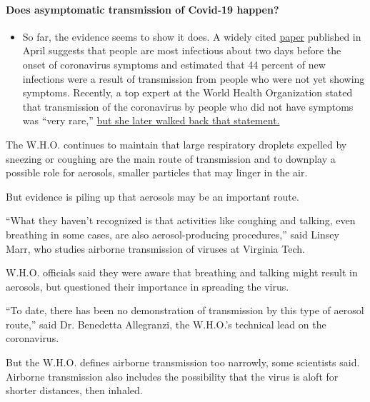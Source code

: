 \begin{itemize}
{  \paragraph{Does asymptomatic transmission of Covid-19
  happen?}\label{does-asymptomatic-transmission-of-covid-19-happen}}

  \begin{itemize}
  \tightlist
  \item
    So far, the evidence seems to show it does. A widely cited
    \href{https://www.nature.com/articles/s41591-020-0869-5}{paper}
    published in April suggests that people are most infectious about
    two days before the onset of coronavirus symptoms and estimated that
    44 percent of new infections were a result of transmission from
    people who were not yet showing symptoms. Recently, a top expert at
    the World Health Organization stated that transmission of the
    coronavirus by people who did not have symptoms was ``very rare,''
    \href{https://www.nytimes.com/2020/06/09/world/coronavirus-updates.html?action=click\&pgtype=Article\&state=default\&region=MAIN_CONTENT_3\&context=storylines_faq\#link-1f302e21}{but
    she later walked back that statement.}
  \end{itemize}
\end{itemize}

The W.H.O. continues to maintain that large respiratory droplets
expelled by sneezing or coughing are the main route of transmission and
to downplay a possible role for aerosols, smaller particles that may
linger in the air.

But evidence is piling up that aerosols may be an important route.

``What they haven't recognized is that activities like coughing and
talking, even breathing in some cases, are also aerosol-producing
procedures,'' said Linsey Marr, who studies airborne transmission of
viruses at Virginia Tech.

W.H.O. officials said they were aware that breathing and talking might
result in aerosols, but questioned their importance in spreading the
virus.

``To date, there has been no demonstration of transmission by this type
of aerosol route,'' said Dr. Benedetta Allegranzi, the W.H.O.'s
technical lead on the coronavirus.

But the W.H.O. defines airborne transmission too narrowly, some
scientists said. Airborne transmission also includes the possibility
that the virus is aloft for shorter distances, then inhaled.

